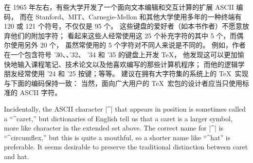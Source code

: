在 1965 年左右，有些大学开发了一个面向文本编辑和交互计算的扩展 ASCII 编码，
而在 Stanford、MIT、Carnegie-Mellon 和其他大学使用多年的一种终端有
120 或 121 个符号，不仅仅是 95 个。
这些键盘的爱好者（如本书作者）不愿意放弃他们的附加字符；
看起来这些人经常使用这 25 个补充字符的其中 5 个，而偶尔使用另外 20 个，
虽然常使用的 5 个字符对不同人来说是不同的。
例如，作者在一个包含符号 {\tentex\char'30}、{\tentex{}}、{\tentex\char'32}、
{\tentex\char'34} 和 {\tentex\char'35} 的键盘上开发 \TeX ，
他发现这可以更加愉快地输入课程笔记、技术论文以及他喜欢编写的那些计算机程序；
而他的逻辑学朋友经常使用 {\tentex\char'24} 和 {\tentex\char'25} 按键；等等。
建议在拥有大字符集的系统上的 \TeX\ 实现与下面的编码保持一致：
\normalchart
\endchart
当然，面向广大用户的 \TeX\ 宏包的设计者应当只使用标准的 ASCII 字符。

Incidentally, the ASCII character |^| that appears in position 
is sometimes called a ``^{caret},'' but dictionaries of English tell us
that a caret is a larger symbol, more like character  in the
extended set above. The correct name for |^| is ``^{circumflex},'' but
this is quite a mouthful, so a shorter name like ``^{hat}'' is preferable.
It seems desirable to preserve the traditional distinction between
caret and hat.

